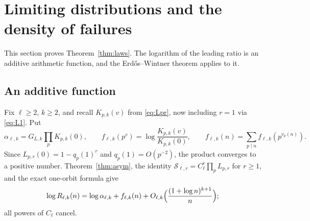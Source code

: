 \documentclass[11pt,a4paper]{article}
\theoremstyle{remark}
\numberwithin{equation}{section}
\newcommand{\Sing}{\mathcal S}
\begin{document}
\section{Limiting distributions and the density of failures}\label{sec:laws}

This section proves Theorem~\ref{thm:laws}. The logarithm of the leading ratio is an additive arithmetic function, and the Erd\H{o}s--Wintner theorem applies to it.

\subsection{An additive function}
Fix $\ell\ge2$, $k\ge2$, and recall $K_{p,k}(v)$ from \eqref{eq:Lpr}, now including $r=1$ via \eqref{eq:L1}. Put
\begin{equation}\label{eq:alpha}
\alpha_{\ell,k}=G_{L,k}\prod_pK_{p,k}(0),\qquad f_{\ell,k}(p^v)=\log\frac{K_{p,k}(v)}{K_{p,k}(0)},\qquad f_{\ell,k}(n)=\sum_{p\mid n}f_{\ell,k}(p^{v_p(n)}).
\end{equation}
Since $L_{p,r}(0)=1-q_p(1)^r$ and $q_p(1)=O(p^{-2})$, the product converges to a positive number. Theorem~\ref{thm:asym}, the identity $\Sing_{\ell,r}=C_\ell^r\prod_pL_{p,r}$ for $r\ge1$, and the exact one-orbit formula give
\begin{equation}\label{eq:logR}
\log R_{\ell,k}(n)=\log\alpha_{\ell,k}+f_{\ell,k}(n)+O_{\ell,k}\Bigl(\frac{(1+\log n)^{k+1}}n\Bigr);
\end{equation}
all powers of $C_\ell$ cancel.
\end{document}
